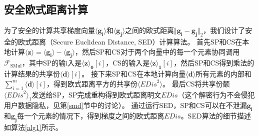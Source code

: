 \subsection{安全欧式距离计算}
为了安全的计算共享梯度向量$\boldsymbol{\langle g_i\rangle}$和$\boldsymbol{\langle g_j\rangle}$之间的欧式距离$\Vert \boldsymbol{g_i} - \boldsymbol{g_j} \Vert_2$，我们设计了安全的欧式距离（Secure Euclidean Distance, SED）计算算法。
首先SP和CS在本地计算$\boldsymbol{\langle z\rangle} = \boldsymbol{\langle g_i\rangle} - \boldsymbol{\langle g_j\rangle}$，然后SP和CS对于两个向量中的每一个元素协同调用$\mathcal{F}_{\text {SMul}}$，其中SP的输i入是$\boldsymbol{\langle z\rangle_0}[i]$，CS的输入是$\boldsymbol{\langle z\rangle_1}[i]$，然后SP和CS得到乘法的计算结果的共享份$\boldsymbol{\langle d\rangle}[i]$。
接下来SP和CS在本地计算向量$\boldsymbol{\langle d\rangle}$所有元素的内部和$\sum_{i=1}^{m} \boldsymbol{\langle d\rangle}[i]$，得到欧式距离平方的共享份$\langle \textit{EDis}^2\rangle$。
最后CS将共享份额$\langle \textit{EDis}^2\rangle_1$发送给SP，SP完成重构得到欧式距离明文$\textit{EDis}$（这个解密行为不会侵犯用户数据隐私，见第\ref{smd}节中的讨论）。
通过运行SED，SP和CS可以在不泄漏$\boldsymbol{g_i}$和$\boldsymbol{g_j}$每一个元素的情况下，得到梯度之间的欧式距离$\textit{EDis}$。SED算法的细节描述如算法\ref{alg1}所示。

